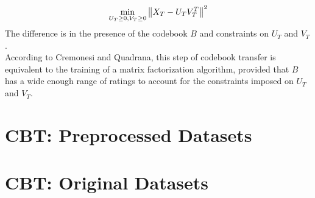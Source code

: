 \begin{equation*}
\min_{U_T \geq 0, V_T \geq 0} \left\lVert X_T - U_T V_T^T\right\rVert^2
\end{equation*}
The difference is in the presence of the codebook $B$ and constraints on $U_T$ and $V_T$.\\
According to Cremonesi and Quadrana, this step of codebook transfer is equivalent to the training of a matrix factorization algorithm, provided that $B$ has a wide enough range of ratings to account for the constraints imposed on $U_T$ and $V_T$.



\section{CBT: Preprocessed Datasets}



\section{CBT: Original Datasets}

